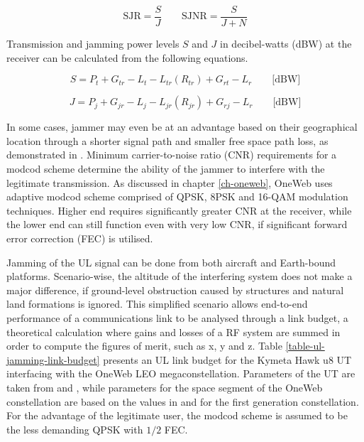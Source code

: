 \documentclass[english, 12pt, a4paper, elec, utf8, a-1b, online]{aaltothesis}
\begin{document}
\begin{equation*}
  \text{SJR} = \frac{S}{J} \qquad
  \text{SJNR} = \frac{S}{J+N}
\end{equation*}

Transmission and jamming power levels $S$ and $J$ in decibel-watts (dBW) at the receiver can be calculated from the following equations.

\begin{equation} \label{eq-signal-power-full}
  S = P_t + G_{tr}-L_t-L_{tr}(R_{tr})+G_{rt}-L_r \qquad \text{[dBW]}
\end{equation}

\begin{equation}
  J = P_j + G_{jr}-L_j-L_{jr}(R_{jr})+G_{rj}-L_r \qquad \text{[dBW]}
\end{equation}

In some cases, jammer may even be at an advantage based on their geographical location through a shorter signal path and smaller free space path loss, as demonstrated in \cite{pavur2022defcon}.
Minimum carrier-to-noise ratio (CNR) requirements for a modcod scheme determine the ability of the jammer to interfere with the legitimate transmission.
As discussed in chapter \ref{ch-oneweb}, OneWeb uses adaptive modcod scheme comprised of QPSK, 8PSK and 16-QAM modulation techniques. Higher end requires significantly greater CNR at the receiver, while the lower end can still function even with very low CNR, if significant forward error correction (FEC) is utilised. \cite{allen2022terrestrial,etsi2012en302307}

Jamming of the UL signal can be done from both aircraft and Earth-bound platforms.
Scenario-wise, the altitude of the interfering system does not make a major difference, if ground-level obstruction caused by structures and natural land formations is ignored.
This simplified scenario allows end-to-end performance of a communications link to be analysed through a link budget, a theoretical calculation where gains and losses of a RF system are summed in order to compute the figures of merit, such as x, y and z.%
Table \ref{table-ul-jamming-link-budget} presents an UL link budget for the Kymeta Hawk u8 UT interfacing with the OneWeb LEO megaconstellation.
Parameters of the UT are taken from \cite{kymeta2022hawk} and \cite{kymeta2020mod}, while parameters for the space segment of the OneWeb constellation are based on the values in \cite{worldvu2016loi} and \cite{allen2022terrestrial} for the first generation constellation.
For the advantage of the legitimate user, the modcod scheme is assumed to be the less demanding QPSK with $1/2$ FEC.
\end{document}
